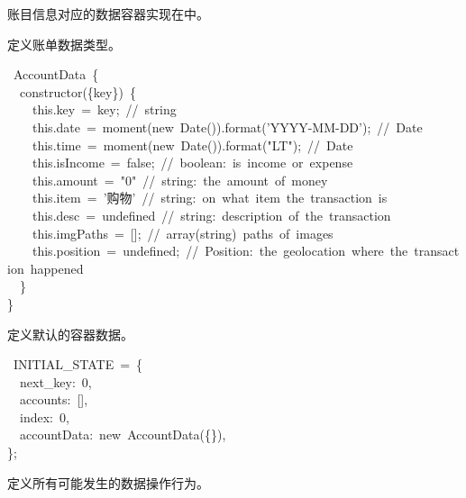 \documentclass{article}
\begin{document}
账目信息对应的数据容器实现在中。%

定义账单数据类型。%
\begin{mdpre}%
~AccountData~\{\\
~~{constructor}(\{key\})~\{\\
~~~~{this}.key~=~key;~{//~string}\\
~~~~{this}.date~=~moment({new}~Date()).format({'}{YYYY-MM-DD}{'});~{//~Date}\\
~~~~{this}.time~=~moment({new}~Date()).format({"}{LT}{"});~{//~Date}\\
~~~~{this}.isIncome~=~{false};~{//~boolean:~is~income~or~expense}\\
~~~~{this}.amount~=~{"}{0}{"}~{//~string:~the~amount~of~money}\\
~~~~{this}.item~=~{'}{购物}{'}~{//~string:~on~what~item~the~transaction~is}\\
~~~~{this}.desc~=~undefined~{//~string:~description~of~the~transaction}\\
~~~~{this}.imgPaths~=~{}[];~{//~array(string)~paths~of~images}\\
~~~~{this}.position~=~undefined;~{//~Position:~the~geolocation~where~the~transaction~happened}\\
~~\}\\
\}%
\end{mdpre}\noindent{}定义默认的容器数据。
\begin{mdpre}%
~INITIAL\_STATE~=~\{\\
~~next\_key:~{0},\\
~~accounts:~{}[],\\
~~index:~{0},\\
~~accountData:~{new}~AccountData(\{\}),\\
\};%
\end{mdpre}\noindent{}定义所有可能发生的数据操作行为。
\end{document}
